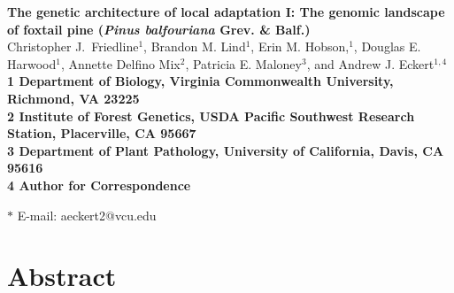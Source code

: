 \documentclass[11pt]{article}
\begin{document}
\begin{flushleft} 
{\Large \textbf{The genetic architecture of local adaptation I: The genomic landscape of 
foxtail pine (\textit{Pinus balfouriana} Grev. \& Balf.)}}
\\
Christopher J.\ Friedline$^{1}$, 
Brandon M. Lind$^{1}$,
Erin M. Hobson,$^{1}$,
Douglas E. Harwood$^{1}$, 
Annette Delfino Mix$^{2}$,
Patricia E. Maloney$^{3}$, and
Andrew J. Eckert$^{1,4}$
\\
\bf{1} Department of Biology, Virginia Commonwealth University, Richmond, VA 23225
\\
\bf{2} Institute of Forest Genetics, USDA Pacific Southwest Research Station, Placerville, 
CA 95667
\\
\bf{3} Department of Plant Pathology, University of California, Davis, CA 95616
\\
\bf{4} Author for Correspondence

$\ast$ E-mail: aeckert2@vcu.edu
\end{flushleft}

\section*{Abstract}
\end{document}
